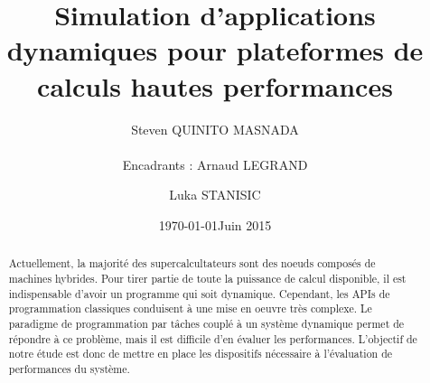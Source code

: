 \documentclass[smallextended]{svjour3}
\date{\today}
\title{}
\begin{document}
\newcommand{\AL}[2][inline]{\todo[color=green!50,#1]{\sf \textbf{AL:} #2}\xspace}
\newcommand{\LS}[2][inline]{\todo[color=green!50,#1]{\sf \textbf{LS:} #2}\xspace}

\let\oldcite=\cite
\renewcommand\cite[2][]{~\ifthenelse{\equal{#1}{}}{\oldcite{#2}}{\oldcite[#1]{#2}}\xspace}
\let\oldref=\ref
\def\ref#1{~\oldref{#1}\xspace}
\def\ie{i.e.,\xspace}
\def\eg{e.g.,\xspace}
\def\qrmspu{\texttt{QRM\_StarPU}\xspace}
\sloppy

\title{Simulation d'applications dynamiques pour plateformes de
calculs hautes performances%
}


\author{Steven QUINITO MASNADA  \\ \\
        Encadrants : Arnaud LEGRAND \and Luka STANISIC  %
}


\institute{%
}

\date{Juin 2015}

\maketitle


\begin{abstract}
Actuellement, la majorité des supercalcultateurs sont des noeuds
composés de machines hybrides. Pour tirer partie de toute la
puissance de calcul disponible, il est indispensable d'avoir un
programme qui soit dynamique. Cependant, les APIs de programmation
classiques conduisent à une mise en oeuvre très complexe.
Le paradigme de programmation par tâches couplé à un système
dynamique permet de répondre à ce problème, mais il est difficile
d'en évaluer les performances. L'objectif de notre étude est donc de
mettre en place les dispositifs nécessaire à l'évaluation de
performances du système. 
\newpage
\end{abstract}
\end{document}

